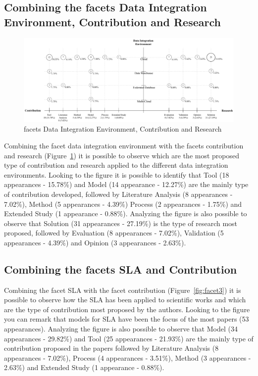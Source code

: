 \subsection{Combining the facets Data Integration Environment, Contribution and Research}

\begin{figure}[h]
\centering
\includegraphics[scale=0.48]{figs/bubble-charts/DI-Environment-Contribution-Research.pdf}
\caption{facets Data Integration Environment, Contribution and Research}\label{fig:facet2}
\end{figure}

Combining the facet data integration environment with the facets contribution and research 
(Figure~\ref{fig:facet2}) it is possible to observe which are the most proposed type of
contribution and research applied to the different data integration environments.  
Looking to the figure it is possible to identify that Tool (18 appearances - 15.78\%) and 
Model (14 appearance - 12.27\%) are the mainly type of contribution developed, 
followed by Literature Analysis (8 appearances - 7.02\%), Method (5 appearances - 4.39\%) 
Process (2 appearances - 1.75\%) and Extended Study (1 appearance - 0.88\%).
Analyzing the figure is also possible to observe that Solution (31 appearances - 27.19\%) is 
the type of research most proposed, 
followed by Evaluation (8 appearances - 7.02\%), Validation (5 appearances - 4.39\%) and
Opinion (3 appearances - 2.63\%).

\subsection{Combining the facets SLA and Contribution}

Combining the facet SLA with the facet contribution (Figure~\ref{fig:facet3}) it is possible 
to observe how the SLA has been applied to scientific works and which are the type of contribution 
most proposed by the authors.
Looking to the figure you can remark that models for SLA have been the focus of the most papers 
(53 appearances).
Analyzing the figure is also possible to observe that Model (34 appearances - 29.82\%) and 
Tool (25 appearances - 21.93\%) are the mainly type of contribution proposed in the papers 
followed by Literature Analysis (8 appearances - 7.02\%), Process (4 appearances - 3.51\%), 
Method (3 appearances - 2.63\%) and Extended Study (1 appearance - 0.88\%).

